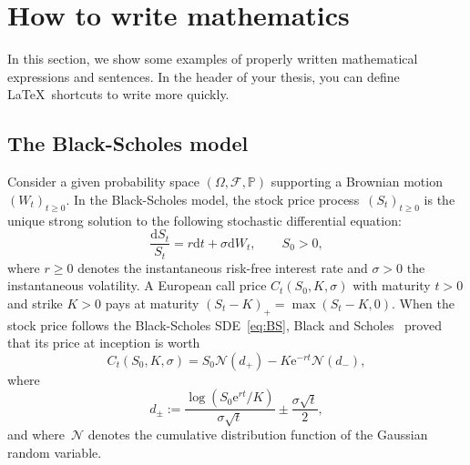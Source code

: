 \documentclass[a4paper, twoside]{report}
\theoremstyle{definition}
\newcommand{\D}{\mathrm{d}}
\newcommand{\E}{\mathrm{e}}
\numberwithin{equation}{section}
\begin{document}
\newpage
\chapter{How to write mathematics}\label{sec:HowTo}
In this section, we show some examples of properly written mathematical expressions and sentences.
In the header of your thesis, you can define \LaTeX \ shortcuts to write more quickly.



\section{The Black-Scholes model}
Consider a given probability space $(\Omega, \mathcal{F},\mathbb{P})$
supporting a Brownian motion~$(W_t)_{t\geq 0}$.
In the Black-Scholes model, the stock price process~$(S_t)_{t\geq 0}$ is the unique strong solution to
the following stochastic differential equation:
\begin{equation}\label{eq:BS}
  \frac{\D S_t}{S_t} = r \D t + \sigma \D W_t,
  \qquad S_0>0,
\end{equation}
where $r\geq 0$ denotes the instantaneous risk-free interest rate and $\sigma>0$ the instantaneous volatility.
A European call price $C_t(S_0,K,\sigma)$ with maturity $t>0$ and strike $K>0$
pays at maturity $(S_t-K)_+=\max(S_t-K,0)$.
When the stock price follows the Black-Scholes SDE~\eqref{eq:BS},
Black and Scholes~\cite{black1973pricing} proved that its price at inception is worth
$$
  C_t(S_0,K,\sigma) = S_0\mathcal{N}(d_+) - K\E^{-rt}\mathcal{N}(d_-),
$$
where
$$
  d_{\pm} := \frac{\log\left(S_0 \E^{rt}/K\right)}{\sigma\sqrt{t}} \pm \frac{\sigma\sqrt{t}}{2},
$$
and where~$\mathcal{N}$ denotes the cumulative distribution function of the Gaussian random variable.








\end{document}
